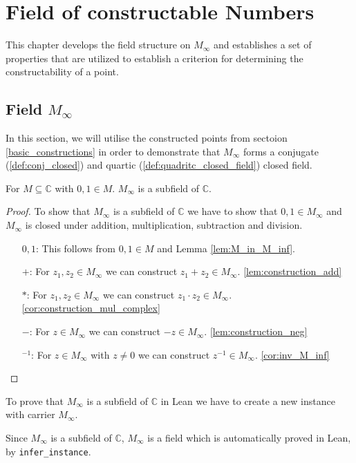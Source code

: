 \chapter{Field of constructable Numbers}
This chapter develops the field structure on $M_{\infty}$ and establishes a set of properties that are utilized to establish a criterion for determining the constructability of a point.
\section[Filed of Constructable Numbers]{Field $M_{\infty}$}
In this section, we will utilise the constructed points from sectoion \ref{basic_constructions} in order to demonstrate that $M_{\infty}$ forms a conjugate (\ref{def:conj_closed}) and quartic (\ref{def:quadritc_closed_field}) closed field.

\begin{theorem}
    \label{thm:MField}
    \leanok
    For $M\subseteq \mathbb{C}$ with $0,1 \in M$. $M_{\infty}$ is a subfield of $\mathbb{C}$.
\end{theorem}
\begin{proof}
    To show that $M_{\infty}$ is a subfield of $\mathbb{C}$ we have to show that $0,1\in M_{\infty}$ and $M_{\infty}$ is closed under addition, multiplication, subtraction and division.
    \begin{itemize}
        \item [$0,1$:] This follows from $0,1 \in M$ and Lemma \ref{lem:M_in_M_inf}.
        \item [$+$:] For $z_1,z_2 \in M_{\infty}$ we can construct $z_1 + z_2 \in M_{\infty}$. \ref{lem:construction_add}
        \item [$*$:] For $z_1,z_2 \in M_{\infty}$ we can construct $z_1 \cdot z_2 \in M_{\infty}$. \ref{cor:construction_mul_complex}
        \item [$-$:] For $z \in M_{\infty}$ we can construct $-z \in M_{\infty}$. \ref{lem:construction_neg}
        \item [$^{-1}$:] For $z \in M_{\infty}$ with $z \ne 0$ we can construct $z^{-1} \in M_{\infty}$. \ref{cor:inv_M_inf}
    \end{itemize}
\end{proof}

\begin{remark}
   To prove that $M_{\infty}$ is a subfield of $\mathbb{C}$ in Lean we have to create a new instance with carrier $M_{\infty}$.
\end{remark}
\begin{remark}
    \label{rem:MField_Field}
    Since $M_{\infty}$ is a subfield of $\mathbb{C}$, $M_{\infty}$ is a field which is automatically proved in Lean, by \lstinline{infer_instance}.
\end{remark}


